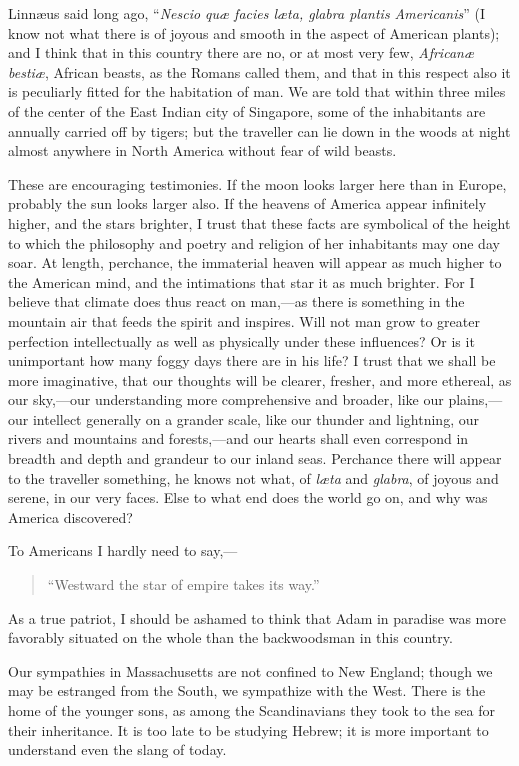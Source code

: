 \documentclass[twoside,openright,10pt]{memoir} %
\begin{document}
Linnæus said long ago, “\emph{Nescio quæ facies læta, glabra plantis Americanis}” (I know not what there is of joyous and smooth in the aspect of American plants); and I think that in this country there are no, or at most very few, \emph{Africanæ bestiæ}, African beasts, as the Romans called them, and that in this respect also it is peculiarly fitted for the habitation of man. We are told that within three miles of the center of the East Indian city of Singapore, some of the inhabitants are annually carried off by tigers; but the traveller can lie down in the woods at night almost anywhere in North America without fear of wild beasts.

These are encouraging testimonies. If the moon looks larger here than in Europe, probably the sun looks larger also. If the heavens of America appear infinitely higher, and the stars brighter, I trust that these facts are symbolical of the height to which the philosophy and poetry and religion of her inhabitants may one day soar. At length, perchance, the immaterial heaven will appear as much higher to the American mind, and the intimations that star it as much brighter. For I believe that climate does thus react on man,—as there is something in the mountain air that feeds the spirit and inspires. Will not man grow to greater perfection intellectually as well as physically under these influences? Or is it unimportant how many foggy days there are in his life? I trust that we shall be more imaginative, that our thoughts will be clearer, fresher, and more ethereal, as our sky,—our understanding more comprehensive and broader, like our plains,—our intellect generally on a grander scale, like our thunder and lightning, our rivers and mountains and forests,—and our hearts shall even correspond in breadth and depth and grandeur to our inland seas. Perchance there will appear to the traveller something, he knows not what, of \emph{læta} and \emph{glabra}, of joyous and serene, in our very faces. Else to what end does the world go on, and why was America discovered?

To Americans I hardly need to say,—

\begin{quotation}
“Westward the star of empire takes its way.”
\end{quotation}
As a true patriot, I should be ashamed to think that Adam in paradise was more favorably situated on the whole than the backwoodsman in this country.

Our sympathies in Massachusetts are not confined to New England; though we may be estranged from the South, we sympathize with the West. There is the home of the younger sons, as among the Scandinavians they took to the sea for their inheritance. It is too late to be studying Hebrew; it is more important to understand even the slang of today.
\end{document}
